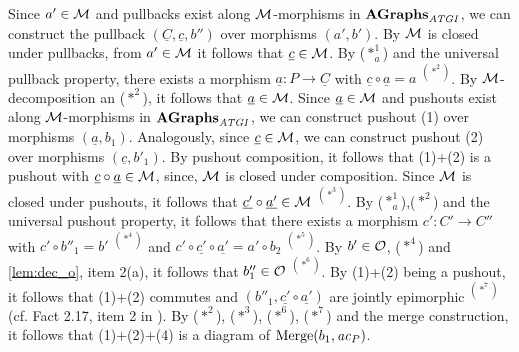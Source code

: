 \begin{description}
\begin{description}
Since $a' \in {\cal M}$ and pullbacks exist along ${\cal M}$-morphisms in $\mathbf{AGraphs}_\mathit{ATGI}$, we can construct the pullback $(\underline{C},\underline{c},b'')$ over morphisms $(a',b')$.
By ${\cal M}$ is closed under pullbacks, from $a' \in {\cal M}$ it follows that $\underline{c} \in {\cal M}$.
By ($*^1_a$) and the universal pullback property, there exists a morphism $\underline{a}\colon P \to \underline{C}$ with $\underline{c} \circ \underline{a}=a$ $^{(*^2)}$.
By ${\cal M}$-decomposition an ($*^2$), it follows that $\underline{a} \in {\cal M}$.
Since $\underline{a} \in {\cal M}$ and pushouts exist along ${\cal M}$-morphisms in $\mathbf{AGraphs}_\mathit{ATGI}$, we can construct pushout (1) over morphisms $(\underline{a}, b_1)$.
Analogously, since $\underline{c} \in {\cal M}$, we can construct pushout (2) over morphisms $(\underline{c},b'_1)$.
By pushout composition, it follows that (1)+(2) is a pushout with $\underline{c} \circ \underline{a} \in {\cal M}$, since, ${\cal M}$ is closed under composition.
Since ${\cal M}$ is closed under pushouts, it follows that $\underline{c'} \circ \underline{a'} \in {\cal M}$ $^{(*^3)}$.
By ($*^1_a$),($*^2$) and the universal pushout property, it follows that there exists a morphism $c'\colon C' \to C''$ with $c' \circ b''_1=b'$ $^{(*^4)}$ and $c' \circ \underline{c'} \circ \underline{a'}=a' \circ b_2$ $^{(*^5)}$.
By $b' \in {\cal O}$, ($*^4$) and \cref{lem:dec_o}, item 2(a), it follows that $b''_1 \in {\cal O}$ $^{(*^6)}$.
By (1)+(2) being a pushout, it follows that (1)+(2) commutes and $(b''_1,\underline{c'} \circ \underline{a'})$ are jointly epimorphic $^{(*^7)}$ (cf. Fact 2.17, item 2 in \cite{Ehrig:2006:FAG:1121741}).
By ($*^2$), ($*^3$), ($*^6$), ($*^7$) and the merge construction, it follows that (1)+(2)+(4) is a diagram of $\mathrm{Merge}(b_1,\mathit{ac}_P)$.


\end{description}
\end{description}
